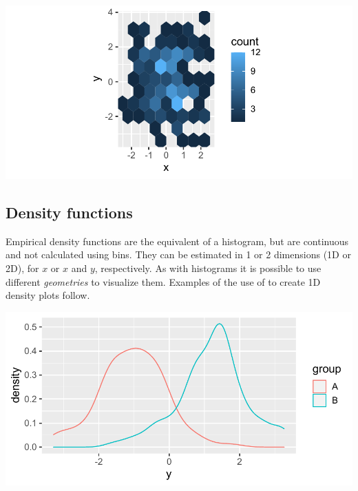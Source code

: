 \documentclass[krantz2]{krantz}\usepackage{knitr}
\begin{document}
\begin{knitrout}\footnotesize
{}\color{fgcolor}\begin{kframe}
\begin{alltt}
  \hlopt{+}
  \hlstd{(} \hlstd{=} \hlstd{)} \hlopt{+}
  \hlstd{(} \hlstd{=} \hlstd{)}
\end{alltt}
\end{kframe}

{\centering \includegraphics[width=.7\textwidth]{figure/pos-hex-plot-01-1} 

}


\end{knitrout}

\subsection{Density functions}\label{sec:plot:density}
Empirical density functions are the equivalent of a histogram, but are continuous and not calculated using bins. They can be estimated in 1 or 2 dimensions (1D or 2D), for $x$ or $x$ and $y$, respectively. As with histograms it is possible to use different \emph{geometries} to visualize them. Examples of the use of  to create 1D density plots follow.

\begin{knitrout}\footnotesize
{}\color{fgcolor}\begin{kframe}
\begin{alltt}
    \hlopt{+}
  \hlstd{()}
\end{alltt}
\end{kframe}

{\centering \includegraphics[width=.7\textwidth]{figure/pos-density-plot-01-1} 

}


\end{knitrout}
\end{document}
